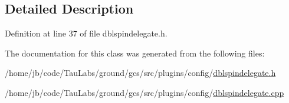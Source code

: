 \subsection{\-Detailed \-Description}


\-Definition at line 37 of file dblspindelegate.\-h.



\-The documentation for this class was generated from the following files\-:\begin{DoxyCompactItemize}
\item 
/home/jb/code/\-Tau\-Labs/ground/gcs/src/plugins/config/\hyperlink{dblspindelegate_8h}{dblspindelegate.\-h}\item 
/home/jb/code/\-Tau\-Labs/ground/gcs/src/plugins/config/\hyperlink{dblspindelegate_8cpp}{dblspindelegate.\-cpp}\end{DoxyCompactItemize}
